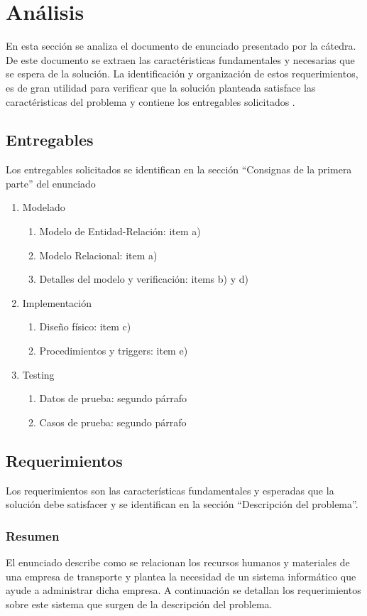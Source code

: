 \section{An\'alisis}
En esta secci\'on se analiza el documento de enunciado presentado por la c\'atedra.
De este documento se extraen las caract\'eristicas fundamentales y necesarias que se espera de la soluci\'on. 
La identificaci\'on y organizaci\'on de estos requerimientos, es de gran utilidad para verificar que la soluci\'on planteada
satisface las caract\'eristicas del problema y contiene los entregables solicitados .\\
\subsection{Entregables}
Los entregables solicitados se identifican en la secci\'on ``Consignas de la primera parte'' del enunciado
\begin{enumerate}
\item Modelado
  \begin{enumerate}[label=\Roman{*}]
  \item Modelo de Entidad-Relaci\'on: item a)
  \item Modelo Relacional: item a)
  \item Detalles del modelo y verificaci\'on: items b) y d)
  \end{enumerate}
\item Implementaci\'on
  \begin{enumerate}[label=\Roman{*}]
  \item Dise\~no f\'isico: item c)
  \item Procedimientos y triggers: item e)
  \end{enumerate}
\item Testing
  \begin{enumerate}[label=\Roman{*}]
  \item Datos de prueba: segundo p\'arrafo
  \item Casos de prueba: segundo p\'arrafo
  \end{enumerate}
\end{enumerate}

\subsection{Requerimientos}
Los requerimientos son las caracter\'isticas fundamentales y esperadas que la soluci\'on debe satisfacer y se identifican en
la secci\'on ``Descripci\'on del problema''. 
\subsubsection{Resumen}
El enunciado describe como se relacionan los recursos humanos y materiales de una empresa de transporte y plantea 
la necesidad de un sistema inform\'atico que ayude a administrar dicha empresa. A continuaci\'on se detallan 
los requerimientos sobre este sistema que surgen de la descripci\'on del problema.
